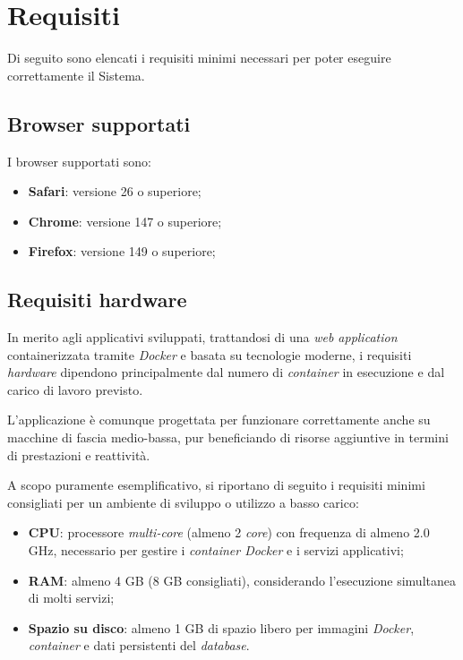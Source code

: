\documentclass[10pt, letterpaper]{article}
\begin{document}
\section{Requisiti}
\label{sec:requisiti}

Di seguito sono elencati i requisiti minimi necessari per poter eseguire correttamente il Sistema.

\subsection{Browser supportati}
\label{sec:browsers}

I browser supportati sono:

\begin{itemize}
    \item   \textbf{Safari}: versione 26 o superiore;
    \item   \textbf{Chrome}: versione 147 o superiore;
    \item   \textbf{Firefox}: versione 149 o superiore;
\end{itemize}

\subsection{Requisiti hardware}
In merito agli applicativi sviluppati, trattandosi di una \textit{web application} containerizzata tramite \textit{Docker} 
e basata su tecnologie moderne, i requisiti \textit{hardware} 
dipendono principalmente dal numero di \textit{container} in esecuzione e dal carico di lavoro previsto.

L'applicazione è comunque progettata per funzionare correttamente anche su macchine di fascia medio-bassa, 
pur beneficiando di risorse aggiuntive in termini di prestazioni e reattività.

A scopo puramente esemplificativo, si riportano di seguito i requisiti minimi consigliati per un ambiente di sviluppo o utilizzo a basso carico:

\begin{itemize}
    \item \textbf{CPU}: processore \textit{multi-core} (almeno 2 \textit{core}) con frequenza di almeno 2.0 GHz, necessario per gestire i \textit{container Docker} e i servizi applicativi;
    \item \textbf{RAM}: almeno 4 GB (8 GB consigliati), considerando l'esecuzione simultanea di molti servizi;
    \item \textbf{Spazio su disco}: almeno 1 GB di spazio libero per immagini \textit{Docker}, \textit{container} e dati persistenti del \textit{database}.
\end{itemize}
\end{document}
